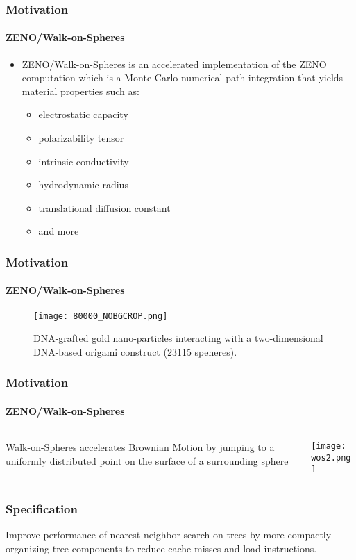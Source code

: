 
\begin{frame}
  \frametitle{Motivation}
  \framesubtitle{ZENO/Walk-on-Spheres}

  \begin{itemize}
    \item ZENO/Walk-on-Spheres is an accelerated implementation of the ZENO computation which is a Monte Carlo
      numerical path integration that yields material properties such as:
    \begin{itemize}
      \item electrostatic capacity
      \item polarizability tensor
      \item intrinsic conductivity 
      \item hydrodynamic radius
      \item translational diffusion constant
      \item and more
    \end{itemize}
  \end{itemize}

\end{frame}

\begin{frame}
  \frametitle{Motivation}
  \framesubtitle{ZENO/Walk-on-Spheres}

  \begin{figure}
    \centering
    \texttt{[image: 80000\_NOBGCROP.png]}
    \caption{DNA-grafted gold nano-particles interacting with a 
    two-dimensional DNA-based origami construct (23115 speheres).}
    \label{fig:80000}
  \end{figure}
\end{frame}

\begin{frame}
  \frametitle{Motivation}
  \framesubtitle{ZENO/Walk-on-Spheres}

  \begin{columns}[T]
    \begin{column}{.5\textwidth}
      \begin{block}{}%
        {\color{white} Walk-on-Spheres accelerates Brownian Motion by jumping%
          to a uniformly distributed point on the surface of a surrounding sphere}
      \end{block}
    \end{column}
    \begin{column}{.5\textwidth}
      \begin{block}{}
        \texttt{[image: wos2.png]}
      \end{block}
    \end{column}
  \end{columns}
\end{frame}

\begin{frame}
  \frametitle{Specification}

  {\color{white}
  Improve performance of nearest neighbor search on \kd trees by more compactly organizing tree components
  to reduce cache misses and load instructions.}

\end{frame}

